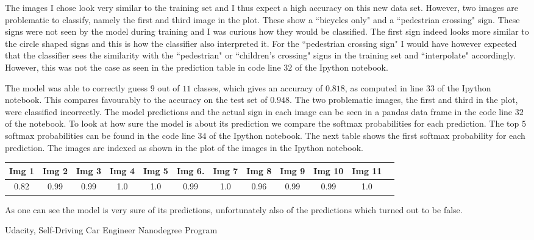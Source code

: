 \documentclass[11pt, a4paper]{amsart}
\begin{document}
       The images I chose look very similar to the training set and I thus expect a high accuracy on this new data set. However, two images are problematic to classify, namely the first and third image in the plot. These show a ``bicycles only" and a ``pedestrian crossing" sign. These signs were not seen by the model during training and I was curious how they would be classified. The first sign indeed looks more similar to the circle shaped signs and this is how the classifier also interpreted it. For the ``pedestrian crossing sign" I would have however expected that the classifier sees the similarity with the ``pedestrian" or ``children's crossing" signs in the training set and ``interpolate" accordingly. However, this was not the case as seen in the prediction table in code line $32$ of the Ipython notebook.  
       
      The model was able to correctly guess $9$ out of $11$ classes, which gives an accuracy of $0.818$, as computed in line $33$ of the Ipython notebook. This compares favourably to the accuracy on the test set  of $0.948$. The two problematic images, the first and third in the plot, were classified incorrectly. The model predictions and the actual sign in each image can be seen in a pandas data frame in the code line $32$ of the notebook.  To look at how sure the model is about its prediction we compare the softmax probabilities for each prediction.  The top $5$ softmax probabilities can be found in the code line $34$ of the Ipython notebook. The next table shows the first softmax probability for each prediction. The images are indexed as shown in the plot of the images in the Ipython notebook.  
\begin{center}
\begin{tabular}{|c|c|c|c|c|c|c|c|c|c|c|c|}
\hline
Img 1 & Img 2 & Img 3 & Img 4 & Img 5 & Img 6. & Img 7 & Img 8 & Img 9 & Img 10 & Img 11\\ \hline
0.82 & 0.99 & 0.99 & 1.0 & 1.0 & 0.99 & 1.0 & 0.96 &  0.99 & 0.99 & 1.0  \\ \hline
\end{tabular}
\end{center}
\noindent
\newline
\noindent       
 As one can see the model is very sure of its predictions, unfortunately also of the predictions which turned out to be false.       
       
\begin{thebibliography}{99}
 Udacity, Self-Driving Car Engineer Nanodegree Program
\end{thebibliography}

	
\end{document}
